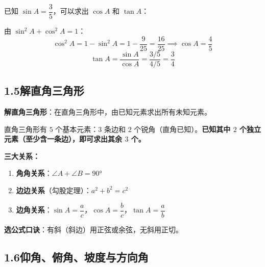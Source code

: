 \documentclass[12pt, a4paper]{ctexart}
\begin{document}
\begin{tipbox}[公式应用举例]
已知 $\sin A = \dfrac{3}{5}$，可以求出 $\cos A$ 和 $\tan A$：

由 $\sin^2 A + \cos^2 A = 1$：
\[
\cos^2 A = 1 - \sin^2 A = 1 - \frac{9}{25} = \frac{16}{25} \implies \cos A = \frac{4}{5}
\]
\[
\tan A = \frac{\sin A}{\cos A} = \frac{3/5}{4/5} = \frac{3}{4}
\]
\end{tipbox}

\subsection*{1.5\quad 解直角三角形}

\begin{knowledgebox}[解直角三角形的方法]
\textbf{解直角三角形}：在直角三角形中，由已知元素求出所有未知元素。

直角三角形有 $5$ 个基本元素：$3$ 条边和 $2$ 个锐角（直角已知）。\textbf{已知其中 $2$ 个独立元素（至少含一条边），即可求出其余 $3$ 个。}

\medskip
\textbf{三大关系：}
\begin{enumerate}[nosep, leftmargin=2em]
  \item \textbf{角角关系}：$\angle A + \angle B = 90°$
  \item \textbf{边边关系}（勾股定理）：$a^2 + b^2 = c^2$
  \item \textbf{边角关系}：$\sin A = \dfrac{a}{c}$，$\cos A = \dfrac{b}{c}$，$\tan A = \dfrac{a}{b}$
\end{enumerate}

\medskip
\textbf{选公式口诀}：有斜（斜边）用正弦或余弦，无斜用正切。
\end{knowledgebox}

\subsection*{1.6\quad 仰角、俯角、坡度与方向角}
\end{document}
